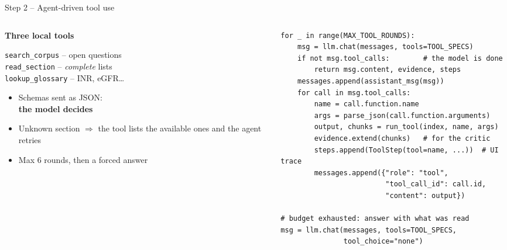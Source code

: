 \documentclass[aspectratio=169,11pt]{beamer}
\begin{document}
\begin{frame}[fragile]{Step 2 -- Agent-driven tool use}
  \begin{columns}[T]
    \begin{column}{0.37\textwidth}
      \small
      \textbf{Three local tools}\\[0.3em]
      {\footnotesize
      \texttt{search\_corpus} -- open questions\\
      \texttt{read\_section} -- \emph{complete} lists\\
      \texttt{lookup\_glossary} -- INR, eGFR\dots\par}
      \vspace{0.6em}
      \begin{itemize}
        \item Schemas sent as JSON:\\ \textbf{the model decides}
        \item Unknown section $\Rightarrow$ the tool lists the available ones and the agent retries
        \item Max 6 rounds, then a forced answer
      \end{itemize}
    \end{column}
    \begin{column}{0.6\textwidth}
\begin{lstlisting}[basicstyle=\ttfamily\fontsize{7.5}{9.2}\selectfont]
for _ in range(MAX_TOOL_ROUNDS):
    msg = llm.chat(messages, tools=TOOL_SPECS)
    if not msg.tool_calls:        # the model is done
        return msg.content, evidence, steps
    messages.append(assistant_msg(msg))
    for call in msg.tool_calls:
        name = call.function.name
        args = parse_json(call.function.arguments)
        output, chunks = run_tool(index, name, args)
        evidence.extend(chunks)   # for the critic
        steps.append(ToolStep(tool=name, ...))  # UI trace
        messages.append({"role": "tool",
                         "tool_call_id": call.id,
                         "content": output})

# budget exhausted: answer with what was read
msg = llm.chat(messages, tools=TOOL_SPECS,
               tool_choice="none")
\end{lstlisting}
    \end{column}
  \end{columns}
\end{frame}
\end{document}
